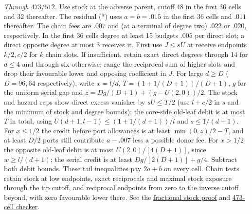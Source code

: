 \documentclass[11pt]{article}
\newcommand{\proofsrc}[2]{\href{https://github.com/uzay-eth/friend-tree-exponent/blob/a0972085ad72ad5685ae7b424988648d1965e73c/#1}{#2}}
\theoremstyle{remark}
\numberwithin{equation}{section}
\begin{document}
\emph{Through $473/512$.} Use stock at the adverse parent, cutoff 48 in the first 36 cells and 32 thereafter. The residual (*) uses $a=b=.015$ in the first 36 cells and $.011$ thereafter. The chain fees are $.007$ and (at a terminal of degree two) $.022$ or $.020$, respectively. In the first 36 cells degree at least 15 budgets $.005$ per direct slot; a direct opposite degree at most 3 receives it. First use $J\le sU$ at receive endpoints $k/2,c/2$ for $k$ chain slots. If insufficient, retain exact direct degrees through 14 for $d\le4$ and through six otherwise; range the reciprocal sum of higher slots and drop their favourable lower and opposing coefficient in $J$. For large $d\ge D$ ($D=96,64$ respectively), write $x=l/d$, $T=(1+1/(D+1))/(D+1)$, $g$ for the uniform serial gap and $z=Dg/(D+1)+(g-U(2,0))/2$. The stock and hazard caps show direct excess vanishes by $sU\le T/2$ (use $l+c/2$ in $s$ and the minimum of stock and degree bounds); the core-side old-leaf debit is at most $T$ in total, using $U(d+1,l-1)\le(1+1/(d+1))/l$ and $s\le1/(d+1)$. For $x\le1/2$ the credit before port allowances is at least $\min(0,z)/2-T$, and at least $D/2$ ports still contribute $a-.007$ less a possible donor fee. For $x>1/2$ the opposite old-leaf debit is at most $U(2,0)/[4(D+1)]$, since $w\ge l/(d+1)$; the serial credit is at least $Dg/[2(D+1)]+g/4$. Subtract both debit bounds. These tail inequalities pay $2a+b$ on every cell. Chain tests retain stock at low endpoints, exact reciprocals and maximal stock exposure through the tip cutoff, and reciprocal endpoints from zero to the inverse cutoff beyond, with zero favourable lower there. See the \proofsrc{round2/proofs/astra-late/source/round2/open/age-order/hub-ranking/mean-ledger/fractional/README.md}{fractional stock proof} and \proofsrc{round2/proofs/astra-late/source/round2/open/age-order/hub-ranking/mean-ledger/fractional/check.py}{473-cell checker}.
\end{document}
